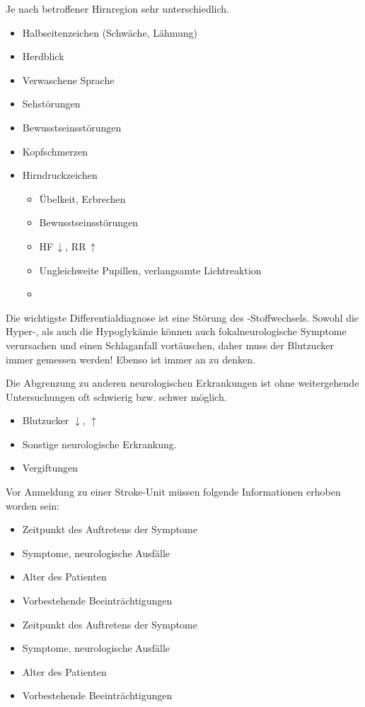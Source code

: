 {
Je nach betroffener Hirnregion sehr unterschiedlich.
\begin{itemize}
  \item Halbseitenzeichen (Schwäche, Lähmung)
  \item Herdblick
  \item Verwaschene Sprache
  \item Sehstörungen
  \item Bewusstseinsstörungen
  \item Kopfschmerzen
  \item Hirndruckzeichen
  \begin{itemize}
    \item Übelkeit, Erbrechen
    \item {} Bewusstseinsstörungen
    \item {} HF\,$\downarrow$, RR\,$\uparrow$
    \item {} Ungleichweite Pupillen, verlangsamte Lichtreaktion
    \item {}
  \end{itemize}
  
\end{itemize}
}{}{}{}


{
Die wichtigste Differentialdiagnose ist eine Störung des
-Stoffwechsels. Sowohl die Hyper-, als auch
die Hypoglykämie können auch fokalneurologische Symptome verursachen
  und einen Schlaganfall vortäuschen, daher
muss der Blutzucker immer gemessen werden!
Ebenso ist immer
an  zu denken.

Die Abgrenzung zu anderen neurologischen Erkrankungen ist
ohne weitergehende Untersuchungen oft schwierig bzw. schwer
möglich. 
}{
\begin{itemize}
  \item Blutzucker ${\downarrow}$, ${\uparrow}$
  \item Sonstige neurologische Erkrankung.
  \item Vergiftungen
\end{itemize}
}

{%
Vor Anmeldung zu einer Stroke-Unit müssen folgende
Informationen erhoben worden sein:

\begin{itemize}
  \item Zeitpunkt des Auftretens der Symptome
  \item Symptome, neurologische Ausfälle
  \item Alter des Patienten
  \item Vorbestehende Beeinträchtigungen
\end{itemize}

}{
\begin{itemize}
  \item Zeitpunkt des Auftretens der Symptome
  \item Symptome, neurologische Ausfälle
  \item Alter des Patienten
  \item Vorbestehende Beeinträchtigungen
\end{itemize}

}{}{}{}

